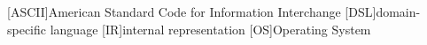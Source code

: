 \begin{acronym}[TDMA]
  [ASCII]{American Standard Code for Information Interchange}
  [DSL]{domain-specific language}
  [IR]{internal representation}
  [OS]{Operating System}
\end{acronym}
